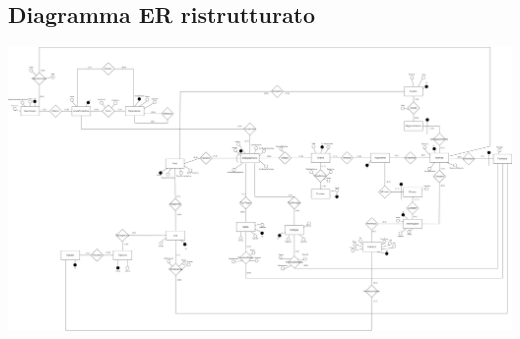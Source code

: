 \subsection{Diagramma ER ristrutturato}
\centerline{\includegraphics[width=18cm,keepaspectratio,angle=0]{src/progettazioneLogica/cantina_er_ristrutturato.png}}